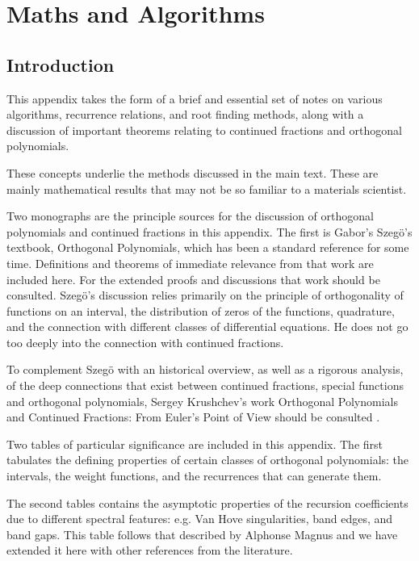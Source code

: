 \chapter{Maths and Algorithms}
\label{app:mathsandalgs}
\section{Introduction}
This appendix takes the form of a brief and essential
set of notes on various algorithms, recurrence relations, and
root finding methods, along with a discussion of important
theorems relating to continued fractions and orthogonal polynomials. 

These concepts underlie the methods discussed in the main text. 
These are mainly mathematical results
that may not be so familiar to a materials scientist.

Two monographs are the principle sources for the discussion
of orthogonal polynomials and continued fractions in this appendix. 
The first is Gabor's Szeg\"o's textbook,
Orthogonal Polynomials, which has been a standard reference
for some time. Definitions and theorems of immediate relevance 
from that work are included here. For the extended proofs and discussions 
that work should be consulted. Szeg\"o's discussion relies primarily
on the principle of orthogonality of functions on an interval, the distribution
of zeros of the functions, quadrature, and the connection with different
classes of differential equations. He does not go too 
deeply into the connection with continued fractions.

To complement Szeg\"o with an historical overview, as well as
a rigorous analysis, of the deep
connections that exist between continued fractions, 
special functions and orthogonal polynomials, Sergey 
Krushchev's work Orthogonal Polynomials and Continued Fractions: From Euler's Point
of View should be consulted \cite{khrushchev10}. 

Two tables of particular significance are included in this
appendix. The first tabulates 
the defining properties of certain classes of orthogonal polynomials:
the intervals, the weight functions, and the recurrences that can generate
them.

The second tables contains the asymptotic properties 
of the recursion coefficients due to different spectral
features: e.g. Van Hove singularities, band edges, and  band gaps. 
This table follows that described by Alphonse Magnus and we 
have extended it here with other references
from the literature.

